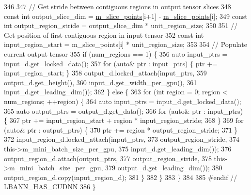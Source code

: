 \begin{DoxyCode}
346 
347       \textcolor{comment}{// Get stride between contiguous regions in output tensor slices}
348       \textcolor{keyword}{const} \textcolor{keywordtype}{int} output\_slice\_dim = \hyperlink{classlbann_1_1slice__layer_af79dab13a70da2e81209e7ae15166e30}{m\_slice\_points}[i+1] - 
      \hyperlink{classlbann_1_1slice__layer_af79dab13a70da2e81209e7ae15166e30}{m\_slice\_points}[i];
349       \textcolor{keyword}{const} \textcolor{keywordtype}{int} output\_region\_stride = output\_slice\_dim * unit\_region\_size;
350 
351       \textcolor{comment}{// Get position of first contiguous region in input tensor}
352       \textcolor{keyword}{const} \textcolor{keywordtype}{int} input\_region\_start = m\_slice\_points[i] * unit\_region\_size;
353 
354       \textcolor{comment}{// Populate current output tensor}
355       \textcolor{keywordflow}{if} (num\_regions == 1) \{
356         \textcolor{keyword}{auto} input\_ptrs = input\_d.get\_locked\_data();
357         \textcolor{keywordflow}{for} (\textcolor{keyword}{auto}& ptr : input\_ptrs) \{ ptr += input\_region\_start; \}
358         output\_d.locked\_attach(input\_ptrs,
359                                output\_d.get\_height(),
360                                input\_d.get\_width\_per\_gpu(),
361                                input\_d.get\_leading\_dim());
362       \} \textcolor{keywordflow}{else} \{
363         \textcolor{keywordflow}{for} (\textcolor{keywordtype}{int} region = 0; region < num\_regions; ++region) \{
364           \textcolor{keyword}{auto} input\_ptrs = input\_d.get\_locked\_data();
365           \textcolor{keyword}{auto} output\_ptrs = output\_d.get\_data();
366           \textcolor{keywordflow}{for} (\textcolor{keyword}{auto}& ptr : input\_ptrs) \{
367             ptr += input\_region\_start + region * input\_region\_stride;
368           \}
369           \textcolor{keywordflow}{for} (\textcolor{keyword}{auto}& ptr : output\_ptrs) \{
370             ptr += region * output\_region\_stride;
371           \}
372           input\_region\_d.locked\_attach(input\_ptrs,
373                                        output\_region\_stride,
374                                        this->m\_mini\_batch\_size\_per\_gpu,
375                                        input\_d.get\_leading\_dim());
376           output\_region\_d.attach(output\_ptrs,
377                                  output\_region\_stride,
378                                  this->m\_mini\_batch\_size\_per\_gpu,
379                                  output\_d.get\_leading\_dim());
380           output\_region\_d.copy(input\_region\_d);
381         \}
382       \}
383     \}
384 
385 \textcolor{preprocessor}{  #endif // LBANN\_HAS\_CUDNN}
386   \}
\end{DoxyCode}
